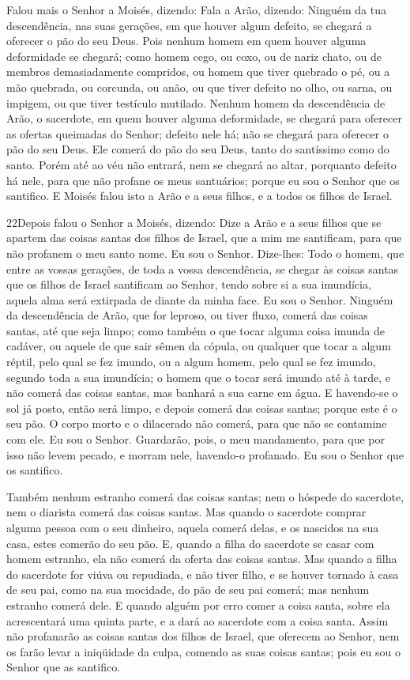 Falou mais o Senhor a Moisés, dizendo: Fala a Arão,
dizendo: Ninguém da tua descendência, nas suas gerações, em que
houver algum defeito, se chegará a oferecer o pão do seu Deus.
Pois nenhum homem em quem houver alguma deformidade se
chegará; como homem cego, ou coxo, ou de nariz chato, ou de membros
demasiadamente compridos, ou homem que tiver quebrado o pé,
ou a mão quebrada, ou corcunda, ou anão, ou que tiver defeito
no olho, ou sarna, ou impigem, ou que tiver testículo mutilado.
Nenhum homem da descendência de Arão, o sacerdote, em quem
houver alguma deformidade, se chegará para oferecer as ofertas
queimadas do Senhor; defeito nele há; não se chegará para oferecer o
pão do seu Deus. Ele comerá do pão do seu Deus, tanto do
santíssimo como do santo. Porém até ao véu não entrará, nem
se chegará ao altar, porquanto defeito há nele, para que não profane
os meus santuários; porque eu sou o Senhor que os santifico.
E Moisés falou isto a Arão e a seus filhos, e a todos os
filhos de Israel.

\medskip

\lettrine{22} Depois falou o Senhor a Moisés, dizendo:
Dize a Arão e a seus filhos que se apartem das coisas santas dos
filhos de Israel, que a mim me santificam, para que não profanem o
meu santo nome. Eu sou o Senhor. Dize-lhes: Todo o homem, que
entre as vossas gerações, de toda a vossa descendência, se chegar às
coisas santas que os filhos de Israel santificam ao Senhor, tendo
sobre si a sua imundícia, aquela alma será extirpada de diante da
minha face. Eu sou o Senhor. Ninguém da descendência de Arão,
que for leproso, ou tiver fluxo, comerá das coisas santas, até que
seja limpo; como também o que tocar alguma coisa imunda de cadáver,
ou aquele de que sair sêmen da cópula, ou qualquer que tocar a
algum réptil, pelo qual se fez imundo, ou a algum homem, pelo qual
se fez imundo, segundo toda a sua imundícia; o homem que o tocar
será imundo até à tarde, e não comerá das coisas santas, mas banhará
a sua carne em água. E havendo-se o sol já posto, então será
limpo, e depois comerá das coisas santas; porque este é o seu pão.
O corpo morto e o dilacerado não comerá, para que não se
contamine com ele. Eu sou o Senhor. Guardarão, pois, o meu
mandamento, para que por isso não levem pecado, e morram nele,
havendo-o profanado. Eu sou o Senhor que os santifico.

Também nenhum estranho comerá das coisas santas; nem o hóspede do
sacerdote, nem o diarista comerá das coisas santas. Mas
quando o sacerdote comprar alguma pessoa com o seu dinheiro, aquela
comerá delas, e os nascidos na sua casa, estes comerão do seu pão.
E, quando a filha do sacerdote se casar com homem estranho,
ela não comerá da oferta das coisas santas. Mas quando a
filha do sacerdote for viúva ou repudiada, e não tiver filho, e se
houver tornado à casa de seu pai, como na sua mocidade, do pão de
seu pai comerá; mas nenhum estranho comerá dele. E quando
alguém por erro comer a coisa santa, sobre ela acrescentará uma
quinta parte, e a dará ao sacerdote com a coisa santa. Assim
não profanarão as coisas santas dos filhos de Israel, que oferecem
ao Senhor, nem os farão levar a iniqüidade da culpa, comendo
as suas coisas santas; pois eu sou o Senhor que as santifico.

